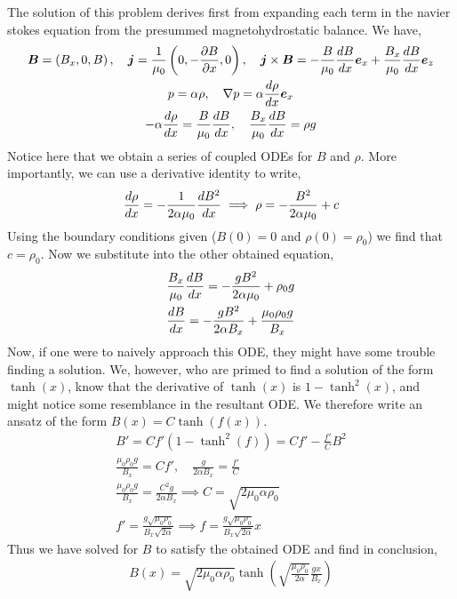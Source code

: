 \documentclass{article}
\begin{document}
\section{}
    The solution of this problem derives first from expanding each term in the
    navier stokes equation from the presummed magnetohydrostatic balance. We
    have, 
    \begin{gather*}
        \boldsymbol{B} = \left(B_x, 0, B\right),\quad \boldsymbol{j} = \frac{1}{\mu_0}\left(0, -\frac{\partial B}{\partial x}, 0\right),
        \quad \boldsymbol{j}\times\boldsymbol{B} = -\frac{B}{\mu_0}\frac{d B}{d x}\boldsymbol{e}_x + \frac{B_x}{\mu_0}\frac{d B}{d x} \boldsymbol{e}_z\\
        p = \alpha\rho, \quad \nabla p = \alpha\frac{d \rho}{d x}\boldsymbol{e}_x\\
        -\alpha\frac{d \rho}{d x} = \frac{B}{\mu_0}\frac{d B}{d x}, \quad
        \frac{B_x}{\mu_0}\frac{d B}{d x} = \rho g
    \end{gather*}
    Notice here that we obtain a series of coupled ODEs for $B$ and $\rho$. More
    importantly, we can use a derivative identity to write, 
    \begin{gather*}
        \frac{d \rho}{d x} = -\frac{1}{2\alpha\mu_0}\frac{d B^2}{d x} \implies \rho =
        -\frac{B^2}{2\alpha\mu_0} + c
    \end{gather*}
    Using the boundary conditions given ($B(0) = 0$ and $\rho(0) = \rho_0$) we
    find that $c = \rho_0$. Now we substitute into the other obtained equation, 
    \begin{gather*}
        \frac{B_x}{\mu_0}\frac{d B}{d x} = -\frac{gB^2}{2\alpha\mu_0} + \rho_0g\\
        \frac{d B}{d x} = -\frac{gB^2}{2\alpha B_x} +
        \frac{\mu_0\rho_0g}{B_x}
    \end{gather*}
    Now, if one were to naively approach this ODE, they might have some trouble
    finding a solution. We, however, who are primed to find a solution of the
    form $\tanh(x)$, know that the derivative of $\tanh(x)$ is $1 - \tanh^2(x)$,
    and might notice some resemblance in the resultant ODE. We therefore write an
    ansatz of the form $B(x) = C\tanh(f(x))$. 
    \begin{gather*}
        B' = Cf'(1 - \tanh^2(f)) = Cf' - \frac{f'}{C}B^2\\
        \frac{\mu_0\rho_0g}{B_x} = Cf',\quad \frac{g}{2\alpha B_x} =
        \frac{f'}{C}\\
        \frac{\mu_0\rho_0g}{B_x} = \frac{C^2g}{2\alpha B_x} \implies C =
        \sqrt{2\mu_0\alpha\rho_0}\\
        f' = \frac{g\sqrt{\mu_0\rho_0}}{B_x\sqrt{2\alpha}} \implies f =
        \frac{g\sqrt{\mu_0\rho_0}}{B_x\sqrt{2\alpha}}x
    \end{gather*}
    Thus we have solved for $B$ to satisfy the obtained ODE and find in
    conclusion, 
    \begin{gather*}
        B(x) = \sqrt{2\mu_0\alpha\rho_0}\tanh\left(\sqrt{\frac{\mu_0\rho_0}{2\alpha}}
        \frac{gx}{B_x}\right)
    \end{gather*}
\end{document}
